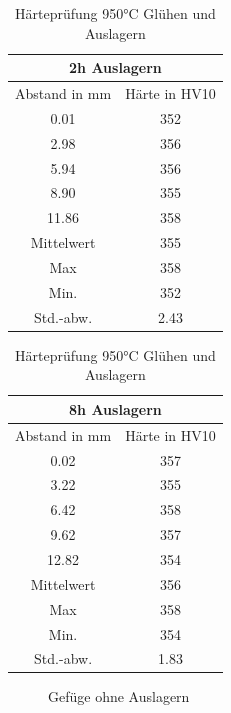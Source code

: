 \documentclass[a4paper, 11pt]{tubsreprt}
\begin{document}
\begin{table}[t] 	%
\begin{tabular}{c|c}
\multicolumn{2}{c}{2h Auslagern} \\
\hline
Abstand in mm	& Härte in HV10 \\
0.01	&	352 \\
2.98	&	356 \\
5.94	&	356 \\
8.90	&	355 \\
11.86	&	358 \\
\hline
Mittelwert	&	355 \\
Max	&	358 \\
Min.	&	352 \\
Std.-abw.	&	2.43 \\

\end{tabular}
\begin{tabular}{c|c}
\multicolumn{2}{c}{8h Auslagern} \\
\hline
Abstand in mm	&	Härte in HV10 \\
0.02	&	357 \\
3.22	&	355 \\
6.42	&	358 \\
9.62	&	357 \\
12.82	&	354 \\
\hline
Mittelwert	&	356 \\
Max	&	358 \\
Min.	&	354 \\
Std.-abw.	&	1.83 \\

\end{tabular}
\caption{Härteprüfung 950°C Glühen und Auslagern}
\label{950alterung}
\end{table}
\begin{figure} 		%
	\caption{Gefüge ohne Auslagern}
	\label{Gefüge ohne Alterung}
\end{figure}
\end{document}
